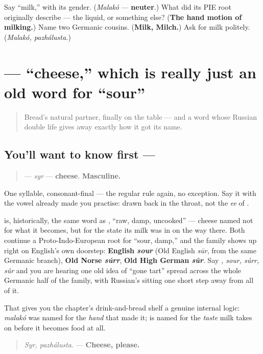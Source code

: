 \begin{tcolorbox}[breakable,colback=teal!4,colframe=teal!35!black,title={Before you move on}]
Say \textquotedblleft{}milk,\textquotedblright{} with its gender. (\emph{Malakó} — \textbf{neuter}.) What did its PIE root originally describe — the liquid, or something else? (\textbf{The hand motion of milking.}) Name two Germanic cousins. (\textbf{Milk, Milch.}) Ask for milk politely. (\emph{Malakó, pazhálusta.})
\end{tcolorbox}
\section[\texorpdfstring{\ru{сыр} (syr)}{сыр (syr)}]{ — \textquotedblleft{}cheese,\textquotedblright{} which is really just an old word for \textquotedblleft{}sour\textquotedblright{}}

\label{lesson:RU-C13-syr}



\begin{quote}
Bread's natural partner, finally on the table — and a word whose Russian double life gives away exactly how it got its name.
\end{quote}

\subsection*{You'll want to know first — }
\begin{quote}
\textbf{} — \emph{syr} — \textbf{cheese}. \textbf{Masculine.}
\end{quote}

One syllable, consonant-final — the regular rule again, no exception. Say it with the vowel \emph{} already made you practise: drawn back in the throat, not the \emph{ee} of \emph{}.

\begin{cousinweb}
\textbf{} is, historically, the same word as \textbf{}, \textquotedblleft{}raw, damp, uncooked\textquotedblright{} — cheese named not for what it becomes, but for the state its milk was in on the way there. Both continue a Proto-Indo-European root for \textquotedblleft{}sour, damp,\textquotedblright{} and the family shows up right on English's own doorstep: \textbf{English \emph{sour}} (Old English \emph{sūr}, from the same Germanic branch), \textbf{Old Norse \emph{súrr}}, \textbf{Old High German \emph{sûr}}. Say \emph{, sour, súrr, sûr} and you are hearing one old idea of \textquotedblleft{}gone tart\textquotedblright{} spread across the whole Germanic half of the family, with Russian's \emph{} sitting one short step away from all of it.

That gives you the chapter's drink-and-bread shelf a genuine internal logic: \emph{malakó} was named for the \emph{hand} that made it; \textbf{} is named for the \emph{taste} milk takes on before it becomes food at all.

\begin{quote}
\emph{Syr, pazhálusta.} — \textbf{Cheese, please.}
\end{quote}
\end{cousinweb}

